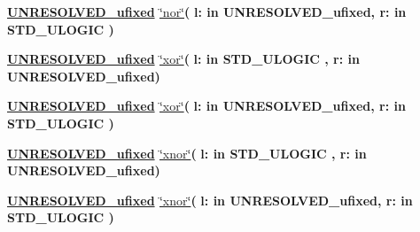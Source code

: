 \begin{DoxyCompactItemize}
\item 
{\bfseries {\bfseries {\bfseries \hyperlink{classfixed__pkg_ae78bc2b36d22f6abeac163955e8a587d}{U\+N\+R\+E\+S\+O\+L\+V\+E\+D\+\_\+ufixed}} \textcolor{vhdlchar}{ }}} \hyperlink{classfixed__pkg_abd2d2f63779c8a7703c306822b3c147b}{\char`\"{}nor\char`\"{}}{\bfseries  ( }{\bfseries \textcolor{vhdlchar}{l\+: }\textcolor{stringliteral}{in }\textcolor{vhdlchar}{U\+N\+R\+E\+S\+O\+L\+V\+E\+D\+\_\+ufixed}}{\bfseries  , \textcolor{vhdlchar}{r\+: }\textcolor{stringliteral}{in }{\bfseries \textcolor{comment}{S\+T\+D\+\_\+\+U\+L\+O\+G\+I\+C}\textcolor{vhdlchar}{ }}}{\bfseries  )} 
\item 
{\bfseries {\bfseries {\bfseries \hyperlink{classfixed__pkg_ae78bc2b36d22f6abeac163955e8a587d}{U\+N\+R\+E\+S\+O\+L\+V\+E\+D\+\_\+ufixed}} \textcolor{vhdlchar}{ }}} \hyperlink{classfixed__pkg_a576457969fe114909f31eab28c36d3e6}{\char`\"{}xor\char`\"{}}{\bfseries  ( }{\bfseries \textcolor{vhdlchar}{l\+: }\textcolor{stringliteral}{in }{\bfseries \textcolor{comment}{S\+T\+D\+\_\+\+U\+L\+O\+G\+I\+C}\textcolor{vhdlchar}{ }}}{\bfseries  , \textcolor{vhdlchar}{r\+: }\textcolor{stringliteral}{in }\textcolor{vhdlchar}{U\+N\+R\+E\+S\+O\+L\+V\+E\+D\+\_\+ufixed}}{\bfseries  )} 
\item 
{\bfseries {\bfseries {\bfseries \hyperlink{classfixed__pkg_ae78bc2b36d22f6abeac163955e8a587d}{U\+N\+R\+E\+S\+O\+L\+V\+E\+D\+\_\+ufixed}} \textcolor{vhdlchar}{ }}} \hyperlink{classfixed__pkg_a576457969fe114909f31eab28c36d3e6}{\char`\"{}xor\char`\"{}}{\bfseries  ( }{\bfseries \textcolor{vhdlchar}{l\+: }\textcolor{stringliteral}{in }\textcolor{vhdlchar}{U\+N\+R\+E\+S\+O\+L\+V\+E\+D\+\_\+ufixed}}{\bfseries  , \textcolor{vhdlchar}{r\+: }\textcolor{stringliteral}{in }{\bfseries \textcolor{comment}{S\+T\+D\+\_\+\+U\+L\+O\+G\+I\+C}\textcolor{vhdlchar}{ }}}{\bfseries  )} 
\item 
{\bfseries {\bfseries {\bfseries \hyperlink{classfixed__pkg_ae78bc2b36d22f6abeac163955e8a587d}{U\+N\+R\+E\+S\+O\+L\+V\+E\+D\+\_\+ufixed}} \textcolor{vhdlchar}{ }}} \hyperlink{classfixed__pkg_ad86ee34881eeb5b246ede3959bbb7289}{\char`\"{}xnor\char`\"{}}{\bfseries  ( }{\bfseries \textcolor{vhdlchar}{l\+: }\textcolor{stringliteral}{in }{\bfseries \textcolor{comment}{S\+T\+D\+\_\+\+U\+L\+O\+G\+I\+C}\textcolor{vhdlchar}{ }}}{\bfseries  , \textcolor{vhdlchar}{r\+: }\textcolor{stringliteral}{in }\textcolor{vhdlchar}{U\+N\+R\+E\+S\+O\+L\+V\+E\+D\+\_\+ufixed}}{\bfseries  )} 
\item 
{\bfseries {\bfseries {\bfseries \hyperlink{classfixed__pkg_ae78bc2b36d22f6abeac163955e8a587d}{U\+N\+R\+E\+S\+O\+L\+V\+E\+D\+\_\+ufixed}} \textcolor{vhdlchar}{ }}} \hyperlink{classfixed__pkg_ad86ee34881eeb5b246ede3959bbb7289}{\char`\"{}xnor\char`\"{}}{\bfseries  ( }{\bfseries \textcolor{vhdlchar}{l\+: }\textcolor{stringliteral}{in }\textcolor{vhdlchar}{U\+N\+R\+E\+S\+O\+L\+V\+E\+D\+\_\+ufixed}}{\bfseries  , \textcolor{vhdlchar}{r\+: }\textcolor{stringliteral}{in }{\bfseries \textcolor{comment}{S\+T\+D\+\_\+\+U\+L\+O\+G\+I\+C}\textcolor{vhdlchar}{ }}}{\bfseries  )} 

\end{DoxyCompactItemize}
